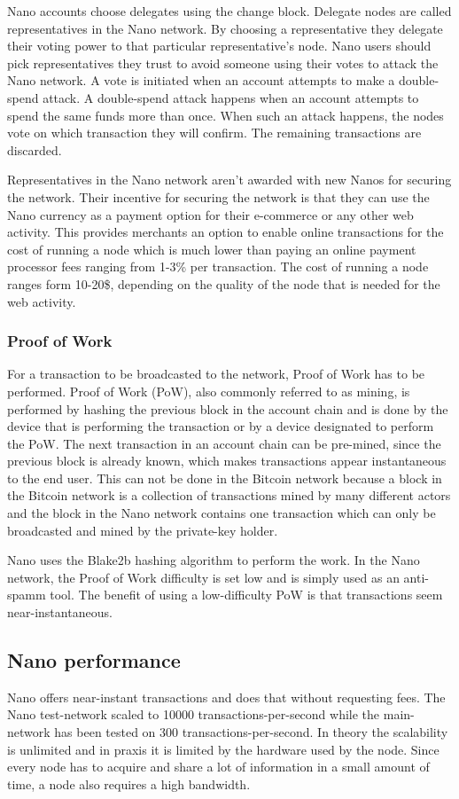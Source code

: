 \documentclass{ferseminar}
\begin{document}
Nano accounts choose delegates using the change block. Delegate nodes are called representatives in the Nano network. By choosing a representative they delegate their voting power to that particular representative's node. Nano users should pick representatives they trust to avoid someone using their votes to attack the Nano network. A vote is initiated when an account attempts to make a double-spend attack. A double-spend attack happens when an account attempts to spend the same funds more than once. When such an attack happens, the nodes vote on which transaction they will confirm. The remaining transactions are discarded.

Representatives in the Nano network aren't awarded with new Nanos for securing the network. Their incentive for securing the network is that they can use the Nano currency as a payment option for their e-commerce or any other web activity. This provides merchants an option to enable online transactions for the cost of running a node which is much lower than paying an online payment processor fees ranging from 1-3\% per transaction. The cost of running a node ranges form 10-20\$, depending on the quality of the node that is needed for the web activity.
\subsubsection{Proof of Work}

For a transaction to be broadcasted to the network, Proof of Work has to be performed. Proof of Work (PoW), also commonly referred to as mining, is performed by hashing the previous block in the account chain and is done by the device that is performing the transaction or by a device designated to perform the PoW. The next transaction in an account chain can be pre-mined, since the previous block is already known, which makes transactions appear instantaneous to the end user. This can not be done in the Bitcoin network because a block in the Bitcoin network is a collection of transactions mined by many different actors and the block in the Nano network contains one transaction which can only be broadcasted and mined by the private-key holder.

Nano uses the Blake2b hashing algorithm to perform the work. In the Nano network, the Proof of Work difficulty is set low and is simply used as an anti-spamm tool. The benefit of using a low-difficulty PoW is that transactions seem near-instantaneous.


\subsection{Nano performance}
Nano offers near-instant transactions and does that without requesting fees. The Nano test-network scaled to 10000 transactions-per-second while the main-network has been tested on 300 transactions-per-second. In theory the scalability is unlimited and in praxis it is limited by the hardware used by the node. Since every node has to acquire and share a lot of information in a small amount of time, a node also requires a high bandwidth.
\end{document}
